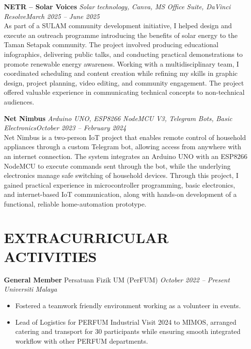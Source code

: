\documentclass[10pt,a4paper]{article}
\newenvironment{project}{
    \begin{itemize}[leftmargin=3ex, rightmargin=2ex, noitemsep, labelsep=1.2mm, itemsep=0mm, topsep=0mm]\small
}{
    \end{itemize}
}
\begin{document}
\textbf{NETR -- Solar Voices} \textbar{} \textit{Solar technology, Canva, MS Office Suite, DaVinci Resolve}\hfill\textit{March 2025 -- June 2025}\\[0.8mm]
As part of a SULAM community development initiative, I helped design and execute an outreach programme introducing the benefits of solar energy to the Taman Setapak community. The project involved producing educational infographics, delivering public talks, and conducting practical demonstrations to promote renewable energy awareness. Working with a multidisciplinary team, I coordinated scheduling and content creation while refining my skills in graphic design, project planning, video editing, and community engagement. The project offered valuable experience in communicating technical concepts to non-technical audiences.
\vspace{3.2mm}

\textbf{Net Nimbus} \textbar{} \textit{Arduino UNO, ESP8266 NodeMCU V3, Telegram Bots, Basic Electronics}\hfill\textit{October 2023 -- February 2024}\\[0.8mm]
Net Nimbus is a two-person IoT project that enables remote control of household appliances through a custom Telegram bot, allowing access from anywhere with an internet connection. The system integrates an Arduino UNO with an ESP8266 NodeMCU to execute commands sent through the bot, while the underlying electronics manage safe switching of household devices. Through this project, I gained practical experience in microcontroller programming, basic electronics, and internet-based IoT communication, along with hands-on development of a functional, reliable home-automation prototype.
\vspace{3mm}


\vspace{0.7mm}
\section*{EXTRACURRICULAR ACTIVITIES}
\textbf{General Member }\textbar{} Persatuan Fizik UM (PerFUM) \hfill \textit{October 2022 -- Present}\\ 
\noindent\textit{Universiti Malaya}
\begin{project}
    \item Fostered a teamwork friendly environment working as a volunteer in events.
    \item Lead of Logistics for PERFUM Industrial Visit 2024 to MIMOS, arranged catering and transport for 30 participants while ensuring smooth integrated workflow with other PERFUM departments.
\end{project}
\vspace{2mm}
\end{document}
